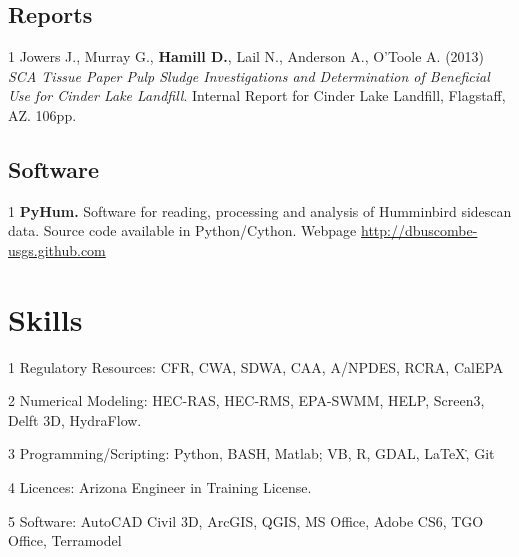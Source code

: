 \documentclass[margin,line]{resume}
\begin{document}
\begin{resume}
	\subsection{\mysidestyle Reports}
        \begin{footnotesize}
	\begin{list1}
		
	\item[1] Jowers J., Murray G., {\bf Hamill D.}, Lail N., Anderson A., O'Toole A. (2013) {\sl SCA Tissue Paper Pulp Sludge Investigations and Determination of Beneficial Use for Cinder Lake Landfill}. Internal Report for Cinder Lake Landfill, Flagstaff, AZ. 106pp.

	\end{list1}
        \end{footnotesize}

	\subsection{\mysidestyle Software}

        \begin{footnotesize}
	\begin{list1}
	 
	\item[1] {\bf PyHum.} Software for reading, processing and analysis of Humminbird sidescan data. Source code available in Python/Cython. Webpage \url{http://dbuscombe-usgs.github.com}\\

	\end{list1}
        \end{footnotesize}

    \section{\mysidestyle Skills} 
    \begin{footnotesize}
    \begin{list1}
        \item[1] Regulatory Resources: CFR, CWA, SDWA, CAA, A/NPDES, RCRA, CalEPA\\
        \item[2] Numerical Modeling: HEC-RAS, HEC-RMS, EPA-SWMM, HELP, Screen3, Delft 3D, HydraFlow.\\
        \item[3] Programming/Scripting: Python, BASH, Matlab; VB, R, GDAL, \LaTeX\., Git\\
        \item[4] Licences: Arizona Engineer in Training License.\\
        \item[5] Software: AutoCAD Civil 3D, ArcGIS, QGIS, MS Office, Adobe CS6, TGO Office, Terramodel\\
    \end{list1}
     \end{footnotesize}


\end{resume}
\end{document}
